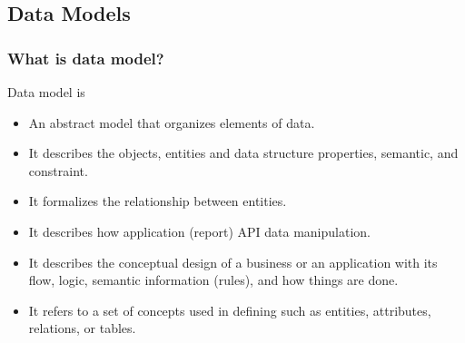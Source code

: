 \subsection{Data Models}
\begin{frame}
\frametitle{What is data model?}
Data model is
	\begin{itemize}[<+->]
		\item An abstract model that organizes elements of data.
		\item It describes the objects, entities and data structure properties, semantic, and constraint.
		\item It formalizes the relationship between entities.
		\item It describes how application (report) API data manipulation.
		\item It describes the conceptual design of a business or an application with its flow, logic, semantic information (rules), and how things are done.
		\item It refers to a set of concepts used in defining such as entities, attributes, relations, or tables.
	\end{itemize}
\end{frame}

